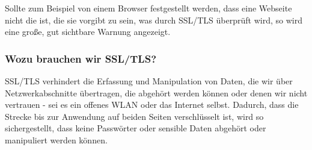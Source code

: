 Sollte zum Beispiel von einem Browser festgestellt werden, dass eine Webseite 
nicht die ist, die sie vorgibt zu sein, was durch SSL/TLS überprüft wird, so 
wird eine große, gut sichtbare Warnung angezeigt.

\subsubsection{Wozu brauchen wir SSL/TLS?}
SSL/TLS verhindert die Erfassung und Manipulation von Daten, die wir über 
Netzwerkabschnitte übertragen, die abgehört werden können oder denen wir nicht 
vertrauen - sei es ein offenes WLAN oder das Internet selbst. Dadurch, dass die 
Strecke bis zur Anwendung auf beiden Seiten verschlüsselt ist, wird so 
sichergestellt, dass keine Passwörter oder sensible Daten abgehört oder 
manipuliert werden können.

